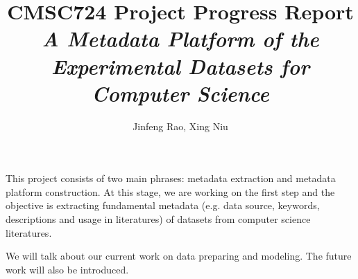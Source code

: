 \documentclass[fleqn]{article}
\begin{document}
\title{CMSC724 Project Progress Report\\\textit{A Metadata Platform of the Experimental Datasets for Computer Science}}
\author{Jinfeng Rao, Xing Niu}
\maketitle

This project consists of two main phrases: metadata extraction and metadata platform construction. At this stage, we are working on the first step and the objective is extracting fundamental metadata (e.g. data source, keywords, descriptions and usage in literatures) of datasets from computer science literatures.

We will talk about our current work on data preparing and modeling. The future work will also be introduced.
\end{document}
